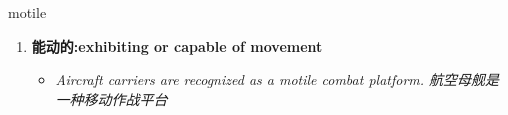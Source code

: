 
\begin{frame}
{\huge motile}
\begin{center}
\begin{enumerate}\Large
  \item \textbf{能动的:exhibiting or capable of movement}
  \begin{itemize}
    \item \em{\Large{Aircraft carriers are recognized as a motile combat platform. 航空母舰是一种移动作战平台}}
  \end{itemize}
\end{enumerate}
\end{center}
\end{frame}
